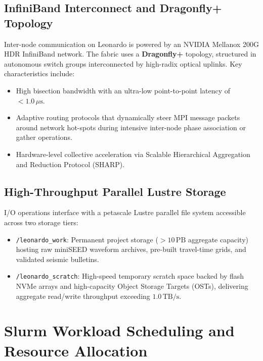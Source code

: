 \subsection{InfiniBand Interconnect and Dragonfly+ Topology}
Inter-node communication on Leonardo is powered by an NVIDIA Mellanox 200G HDR InfiniBand network. The fabric uses a \textbf{Dragonfly+} topology, structured in autonomous switch groups interconnected by high-radix optical uplinks. Key characteristics include:
\begin{itemize}
  \item High bisection bandwidth with an ultra-low point-to-point latency of $< 1.0\,\mu\mathrm{s}$.
  \item Adaptive routing protocols that dynamically steer MPI message packets around network hot-spots during intensive inter-node phase association or gather operations.
  \item Hardware-level collective acceleration via Scalable Hierarchical Aggregation and Reduction Protocol (SHARP).
\end{itemize}

\subsection{High-Throughput Parallel Lustre Storage}
I/O operations interface with a petascale Lustre parallel file system accessible across two storage tiers:
\begin{itemize}
  \item \texttt{/leonardo\_work}: Permanent project storage ($> 10\,\mathrm{PB}$ aggregate capacity) hosting raw miniSEED waveform archives, pre-built travel-time grids, and validated seismic bulletins.
  \item \texttt{/leonardo\_scratch}: High-speed temporary scratch space backed by flash NVMe arrays and high-capacity Object Storage Targets (OSTs), delivering aggregate read/write throughput exceeding $1.0\,\mathrm{TB/s}$.
\end{itemize}

\section{Slurm Workload Scheduling and Resource Allocation}
\label{sec:slurm_scheduling}

